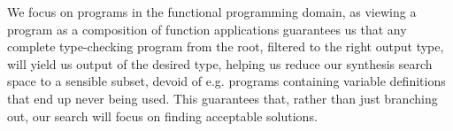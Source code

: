 \documentclass{article} %
\begin{document}



We focus on programs in the functional programming domain, as viewing a program as a composition of function applications guarantees us that any complete type-checking program from the root,
filtered to the right output type,
will yield us output of the desired type,
helping us reduce our synthesis search space to a sensible subset,
devoid of e.g. programs containing variable definitions that end up never being used.
This guarantees that, rather than just branching out,
our search will focus on finding acceptable solutions.

\end{document}
